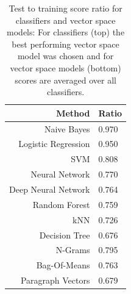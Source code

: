 \clearpage

\begin{table}
\centering
\begin{tabular}{ r l }
  \toprule
  Method & Ratio \\
  \midrule
  Naive Bayes & 0.970 \\
  Logistic Regression & 0.950 \\
  SVM & 0.808 \\
  Neural Network & 0.770 \\
  Deep Neural Network & 0.764 \\
  Random Forest & 0.759 \\
  kNN & 0.726 \\
  Decision Tree & 0.676 \\
  \midrule
  N-Grams & 0.795 \\
  Bag-Of-Means & 0.763 \\
  Paragraph Vectors & 0.679 \\
  \bottomrule
\end{tabular}
\caption{Test to training score ratio for classifiers and vector space models: For classifiers (top) the best performing vector space model was chosen and for vector space models (bottom) scores are averaged over all classifiers.}
\label{tab:Test/Training Ratio}
\end{table}

